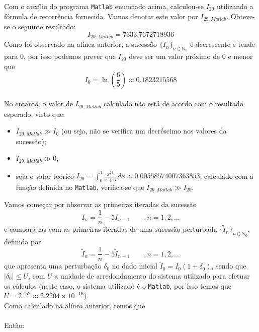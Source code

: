 \documentclass[12pt,a4paper]{article}
\begin{document}
           Com o auxílio do programa \texttt{Matlab} enunciado acima, calculou-se \( I_{29} \) utilizando a fórmula de recorrência fornecida. Vamos denotar este valor por \( I_{29,Matlab} \). Obteve-se o seguinte resultado:
           \[
           I_{29,Matlab} = 7333.7672718936
           \]
           Como foi observado na alínea anterior, a sucessão \( \{I_n\}_{n \in \mathbb{N}_0} \) é decrescente e tende para 0, por isso podemos prever que \( I_{29} \) deve ser um valor próximo de 0 e menor que 
           \[
           I_{0} = \ln\left(\frac{6}{5}\right)  \approx 0.1823215568
           \]\\
           \noindent No entanto, o valor de \( I_{29,Matlab} \) calculado não está de acordo com o resultado esperado, visto que:
           \begin{itemize}
            \item  \( I_{29,Matlab}\gg I_{0}\) (ou seja, não se verifica um decréscimo nos valores da sucessão);
            \item \( I_{29,Matlab}\gg 0\);
            \item seja o valor teórico \(I_{29}=\int_{0}^{1} \frac{x^{29}}{x+5} \, dx \approx 0.00558574007363853\), calculado com a função definida no \texttt{Matlab}, verifica-se que \( I_{29,Matlab}\gg I_{29}\).
            \end{itemize}

         \noindent Vamos começar por observar as primeiras iteradas da sucessão \[I_{n}=\frac{1}{n}-5I_{n-1}\qquad  ,  n=1,2,\ldots\] e compará-las com as primeiras iteradas de uma sucessão perturbada \( \{\tilde{I}_n\}_{n \in \mathbb{N}_0} \), definida por \[\tilde{I}_{n}=\frac{1}{n}-5\tilde{I}_{n-1} \qquad,  n=1,2,\ldots \]que apresenta uma perturbação \(\delta_{0}\) no dado inicial \(\tilde{I}_{0}=I_0(1+\delta_0)\), sendo que \(|\delta_0|\leq U\), com \(U\) a unidade de arredondamento do sistema utilizado para efetuar os cálculos (neste caso, o sistema utilizado é o \texttt{Matlab}, por isso temos que \(U=2^{-52}\approx2.2204\times10^{-16}\)).\\
         
         \noindent Como calculado na alínea anterior, temos que\\  
         
         \\
         
         Então:
         
\end{document}
